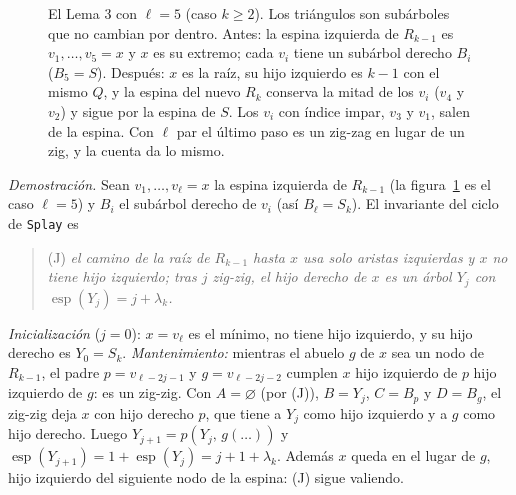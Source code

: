 \documentclass[11pt]{article}
\newcommand{\esp}{\operatorname{esp}}
\begin{document}
\begin{figure}[!ht]
\caption{El Lema 3 con $\ell=5$ (caso $k\ge2$). Los triángulos son subárboles que no cambian por dentro. Antes: la espina izquierda de $R_{k-1}$ es
$v_1,\dots,v_5=x$ y $x$ es su extremo; cada $v_i$ tiene un subárbol derecho $B_i$ ($B_5=S$). Después: $x$ es la raíz, su hijo izquierdo es $k-1$ con el mismo $Q$, y la
espina del nuevo $R_k$ conserva la mitad de los $v_i$ ($v_4$ y $v_2$) y sigue por la espina de $S$. Los $v_i$ con índice impar, $v_3$ y $v_1$,
salen de la espina. Con $\ell$ par el último paso es un zig-zag en lugar de un zig, y la cuenta da lo mismo.}
\label{fig:lema3}
\end{figure}

\textit{Demostración.} Sean $v_1,\dots,v_\ell=x$ la espina izquierda de $R_{k-1}$ (la figura~\ref{fig:lema3} es el caso $\ell=5$) y $B_i$ el subárbol
derecho de $v_i$ (así $B_\ell=S_k$). El invariante del ciclo de \texttt{Splay} es
\begin{quote}
(J) \emph{el camino de la raíz de $R_{k-1}$ hasta $x$ usa solo aristas izquierdas y $x$ no tiene hijo izquierdo; tras $j$ zig-zig, el hijo derecho de $x$ es un
árbol $Y_j$ con $\esp(Y_j)=j+\lambda_k$.}
\end{quote}
\emph{Inicialización} ($j=0$): $x=v_\ell$ es el mínimo, no tiene hijo izquierdo, y su hijo derecho es $Y_0=S_k$. \emph{Mantenimiento:} mientras el abuelo $g$ de $x$ sea un
nodo de $R_{k-1}$, el padre $p=v_{\ell-2j-1}$ y $g=v_{\ell-2j-2}$ cumplen $x$ hijo izquierdo de $p$ hijo izquierdo de $g$: es un zig-zig. Con $A=\varnothing$ (por (J)), $B=Y_j$,
$C=B_p$ y $D=B_g$, el zig-zig deja $x$ con hijo derecho $p$, que tiene a $Y_j$ como hijo izquierdo y a $g$ como hijo derecho. Luego $Y_{j+1}=p(Y_j,\,g(\dots))$ y
$\esp(Y_{j+1})=1+\esp(Y_j)=j+1+\lambda_k$. Además $x$ queda en el lugar de $g$, hijo izquierdo del siguiente nodo de la espina: (J) sigue valiendo.
\end{document}
